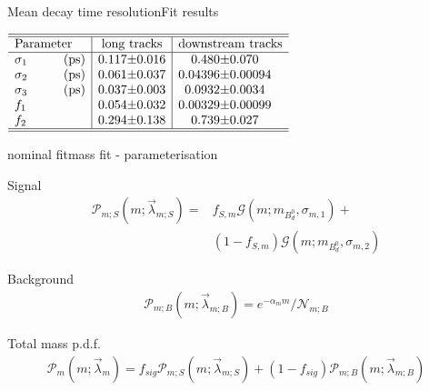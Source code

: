 \documentclass{beamer}
\newcommand{\Bd}{$B_d^0$}
\begin{document}
    \begin{frame}{Mean decay time resolution}{Fit results}
    \begin{center}
    $\begin{array}{l | r@{\pm}l | r@{\pm}l}
\hline 
\hline
\text{Parameter} & \multicolumn{2}{c|}{\text{long tracks}} & \multicolumn{2}{c}{\text{downstream tracks}}\\
\hline
\sigma_{1}\hspace{1cm}(\text{ps}) &	0.117 & 0.016 & 0.480 & 0.070\\
\sigma_{2}\hspace{1cm}(\text{ps}) &	0.061 & 0.037 & 0.04396 & 0.00094\\
\sigma_{3}\hspace{1cm}(\text{ps}) &0.037 &	0.003 & 0.0932 & 0.0034 \\
f_{1} &0.054 & 0.032 & 0.00329 & 0.00099\\
f_{2} &0.294 & 0.138 & 0.739 & 0.027\\ \hline \hline
\end{array}$   
    \end{center}
    \end{frame}        	
	
	\begin{frame}{nominal fit}{mass fit - parameterisation}
	\begin{block}{Signal}
	\begin{align}
\nonumber \mathcal{P}_{m;S}(m;\vec{\lambda}_{m;S}) = &f_{S,m}\mathcal{G}(m;m_{\text{\Bd}},\sigma_{m,1}) + \\
&(1-f_{S,m})\mathcal{G}(m;m_{\text{\Bd}},\sigma_{m,2})
\end{align}
\end{block}
\begin{block}{Background}
\begin{align}
\mathcal{P}_{m;B}(m;\vec{\lambda}_{m;B}) = e^{-\alpha_m m}/\mathcal{N}_{m;B}
\end{align}
\end{block}
\begin{block}{Total mass p.d.f.}
\begin{align}
\mathcal{P}_{m}(m;\vec{\lambda}_{m}) = f_{sig}\mathcal{P}_{m;S}(m;\vec{\lambda}_{m;S}) + (1-f_{sig})\mathcal{P}_{m;B}(m;\vec{\lambda}_{m;B})
\end{align}
\end{block}
	\end{frame}
	
\end{document}
